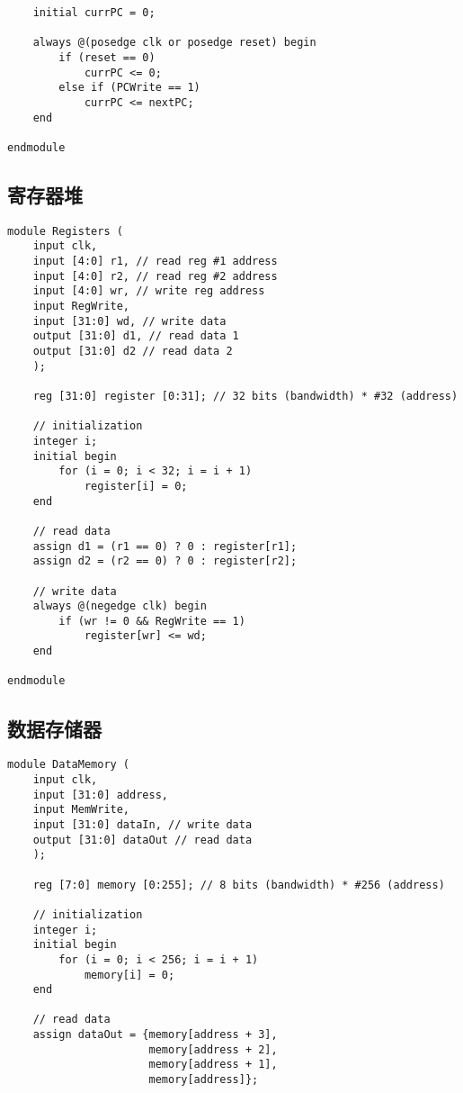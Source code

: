 \begin{multicols}{2}
\begin{lstlisting}
    initial currPC = 0;

    always @(posedge clk or posedge reset) begin
        if (reset == 0)
            currPC <= 0;
        else if (PCWrite == 1)
            currPC <= nextPC;
    end

endmodule
\end{lstlisting}

\subsection{寄存器堆}
\begin{lstlisting}
module Registers (
    input clk,
    input [4:0] r1, // read reg #1 address
    input [4:0] r2, // read reg #2 address
    input [4:0] wr, // write reg address
    input RegWrite,
    input [31:0] wd, // write data
    output [31:0] d1, // read data 1
    output [31:0] d2 // read data 2
    );
    
    reg [31:0] register [0:31]; // 32 bits (bandwidth) * #32 (address)
    
    // initialization
    integer i;
    initial begin
        for (i = 0; i < 32; i = i + 1)
            register[i] = 0;
    end

    // read data
    assign d1 = (r1 == 0) ? 0 : register[r1];
    assign d2 = (r2 == 0) ? 0 : register[r2];

    // write data
    always @(negedge clk) begin
        if (wr != 0 && RegWrite == 1)
            register[wr] <= wd;
    end

endmodule
\end{lstlisting}

\subsection{数据存储器}
\begin{lstlisting}
module DataMemory (
    input clk,
    input [31:0] address,
    input MemWrite,
    input [31:0] dataIn, // write data
    output [31:0] dataOut // read data
    );
    
    reg [7:0] memory [0:255]; // 8 bits (bandwidth) * #256 (address)

    // initialization
    integer i;
    initial begin
        for (i = 0; i < 256; i = i + 1)
            memory[i] = 0;
    end

    // read data
    assign dataOut = {memory[address + 3],
    				  memory[address + 2],
    				  memory[address + 1],
    				  memory[address]};


\end{lstlisting}
\end{multicols}
